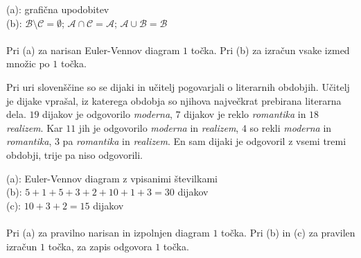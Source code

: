 \documentclass[addpoints]{exam}
\begin{document}
\begin{questions}

    \begin{solution}[7cm]
        (a): grafična upodobitev \\
        (b): $\mathcal{B}\setminus\mathcal{C}=\emptyset$; $\mathcal{A}\cap\mathcal{C}=\mathcal{A}$; $\mathcal{A}\cup\mathcal{B}=\mathcal{B}$ \\ \\
        Pri (a) za narisan Euler-Vennov diagram $1$ točka. Pri (b) za izračun vsake izmed množic po $1$ točka.
    \end{solution}






    
    \question
    Pri uri slovenščine so se dijaki in učitelj pogovarjali o literarnih obdobjih.  Učitelj je dijake vprašal, iz katerega obdobja so njihova največkrat prebirana literarna dela.
    $19$ dijakov je odgovorilo \textit{moderna}, $7$ dijakov je reklo \textit{romantika} in $18$ \textit{realizem}. Kar $11$ jih je odgovorilo \textit{moderna} in \textit{realizem}, $4$ so rekli \textit{moderna} in \textit{romantika},
    $3$ pa \textit{romantika} in \textit{realizem}. En sam dijaki je odgovoril z vsemi tremi obdobji, trije pa niso odgovorili. 

    \begin{solution}[8cm]
        (a): Euler-Vennov diagram z vpisanimi številkami \\
        (b): $5+1+5+3+2+10+1+3=30$ dijakov \\
        (c): $10+3+2=15$ dijakov \\ \\
        Pri (a) za pravilno narisan in izpolnjen diagram $1$ točka. Pri (b) in (c) za pravilen izračun $1$ točka, za zapis odgovora $1$ točka.
    \end{solution}





\end{questions}
\end{document}
